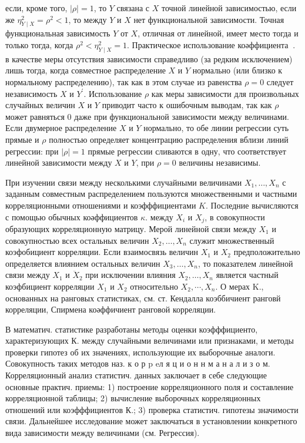 \documentclass[10pt]{article}
\begin{document}
если, кроме того, $|\rho|=1$, то $Y$ связана с $X$ точной линейной зависимостью, если же $\eta_{Y \mid X}^{2}=\rho^{2}<1$, то между $Y$ и $X$ нет функциональной зависимости. Точная функциональная зависимость $Y$ от $X$, отличная от линейной, имеет место тогда и только тогда, когда $\rho^{2}<\eta_{Y \mid X}^{2}=1$. Практическое использование коәффициента $\mathcal{~}$. в качестве меры отсутствия зависимости справедливо (за редким исключением) лишь тогда, когда совместное распределение $X$ и $Y$ нормально (или близко к нормальному распределению), так как в этом случае из равенства $\rho=0$ следует независимость $X$ и $Y^{\prime}$. Использование $\rho$ как меры зависимости для произвольных случайных величин $X$ и $Y$ приводит часто к ошибочным выводам, так как $\rho$ может равняться 0 даже при функциональной зависимости между величинами. Если двумерное распределение $X$ и $Y$ нормально, то обе линии регрессии суть прямые и $\rho$ полностью определяет концентрацию распределения вблизи линий регрессии: при $|\rho|=1$ прямые регрессии сливаются в одну, что соответствует линейной зависимости между $X$ и $Y$, при $\rho=0$ величины независимы.



При изучении связи между несколькими случайными величинами $X_{1}, \ldots, X_{n}$ с заданным совместным распределением пользуются множественными и частными корреляционными отношениями и коэфффициентами $K$. Последние вычисляются с помощью обычных коәффициентов $\kappa$. между $X_{i}$ и $X_{j}$, в совокупности образующих корреляционную матрицу. Мерой линейной связи между $X_{1}$ и совокупностью всех остальных величин $X_{2}, \ldots, X_{n}$ служит множественный коэфобициент корреляции. Если взаимосвязь величин $X_{1}$ и $X_{2}$ предположительно определяется влиянием остальных величин $X_{3}, \ldots, X_{n}$, то показателем линейной связи между $X_{1}$ и $\ddot{X}_{2}$ при исключении влияния $X_{2}, \ldots, X_{n}$ является частный коэфбициент корреляции $X_{1}$ и $X_{2}$ относительно $X_{2}, \cdots, X_{n}$. О мерах K., основанных на ранговых статистиках, см. ст. Кендалла коэббичиент ранговй корреляции, Спирмена коәффичиент ранговой корреляции.



В математич. статистике разработаны методы оценки коэфффициенто, характеризующих $К$. между случайными величинами или признаками, и методы проверки гипотез об их значениях, использующие их выборочные аналоги. Совокупность таких методов наз. к о р p eл я ц и о н н м а н а л и з о м. Корреляционный анализ статистич. данных заключает в себе следующие основные практич. приемы: 1) построение корреляционного поля и составление корреляционной таблицы; 2) вычисление выборочных корреляционных отношений или коэфффициентов К.; 3) проверка статистич. гипотезы значимости связи. Дальнейшее исследование может заключаться в установлении конкретного вида зависимости между величинами (см. Регрессия).
\end{document}
